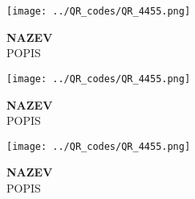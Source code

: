 \documentclass[10pt, a4paper]{article}%
\begin{document}
\begin{minipage}[c][2.9cm][c]{1.5cm}\texttt{[image: ../QR\_codes/QR\_4455.png]}\end{minipage}\begin{minipage}[c][2.9cm][c]{4.7cm}\normalsize\textbf{NAZEV}\\\small POPIS\end{minipage}\hspace{0.1cm}
\begin{minipage}[c][2.9cm][c]{1.5cm}\texttt{[image: ../QR\_codes/QR\_4455.png]}\end{minipage}\begin{minipage}[c][2.9cm][c]{4.7cm}\normalsize\textbf{NAZEV}\\\small POPIS\end{minipage}\hspace{0.1cm}
\begin{minipage}[c][2.9cm][c]{1.5cm}\texttt{[image: ../QR\_codes/QR\_4455.png]}\end{minipage}\begin{minipage}[c][2.9cm][c]{4.7cm}\normalsize\textbf{NAZEV}\\\small POPIS\end{minipage}\hspace{0.1cm}
\end{document}
